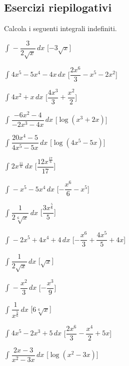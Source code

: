 \pagebreak %

\subsection{Esercizi riepilogativi}


\begin{esercizio}\label{ese: misti}
Calcola i seguenti integrali indefiniti.
\begin{multicols}{2}
 \begin{enumeratea}
\item \(\int_{}^{}- \dfrac{3}{2 \sqrt{x}}\, dx\) 
 \hfill [\(- 3 \sqrt{x}\)]
\item \(\int_{}^{}4 x^{5} - 5 x^{4} - 4 x\, dx\)
 \hfill [\(\dfrac{2 x^{6}}{3} - x^{5} - 2 x^{2}\)]
\item \(\int_{}^{}4 x^{2} + x\, dx\) 
 \hfill [\(\dfrac{4 x^{3}}{3} + \dfrac{x^{2}}{2}\)]
\item \(\int_{}^{}\dfrac{- 6 x^{2} - 4}{- 2 x^{3} - 4 x}\, dx\) 
 \hfill [\(\log{\left (x^{3} + 2 x \right )}\)]
\item \(\int_{}^{}\dfrac{20 x^{4} - 5}{4 x^{5} - 5 x}\, dx\) 
 \hfill [\(\log{\left (4 x^{5} - 5 x \right )}\)]
\item \(\int_{}^{}2 x^{\frac{11}{6}}\, dx\) 
 \hfill [\(\dfrac{12 x^{\frac{17}{6}}}{17}\)]
\item \(\int_{}^{}- x^{5} - 5 x^{4}\, dx\) 
 \hfill [\(- \dfrac{x^{6}}{6} - x^{5}\)]
\item \(\int_{}^{}\dfrac{1}{2 \sqrt[6]{x}}\, dx\) 
 \hfill [\(\dfrac{3 x^{\frac{5}{6}}}{5}\)]
\item \(\int_{}^{}- 2 x^{5} + 4 x^{4} + 4\, dx\) 
 \hfill [\(- \dfrac{x^{6}}{3} + \dfrac{4 x^{5}}{5} + 4 x\)]
\item \(\int_{}^{}\dfrac{1}{2 \sqrt{x}}\, dx\) 
 \hfill [\(\sqrt{x}\)]
\item \(\int_{}^{}- \dfrac{x^{2}}{3}\, dx\) 
 \hfill [\(- \dfrac{x^{3}}{9}\)]
\item \(\int_{}^{}\dfrac{1}{x^{\frac{5}{6}}}\, dx\) 
 \hfill [\(6 \sqrt[6]{x}\)]
\item \(\int_{}^{}4 x^{5} - 2 x^{3} + 5\, dx\) 
 \hfill [\(\dfrac{2 x^{6}}{3} - \dfrac{x^{4}}{2} + 5 x\)]
\item \(\int_{}^{}\dfrac{2 x - 3}{x^{2} - 3 x}\, dx\) 
 \hfill [\(\log{\left (x^{2} - 3 x \right )}\)]

\end{enumeratea}
\end{multicols}
\end{esercizio}
